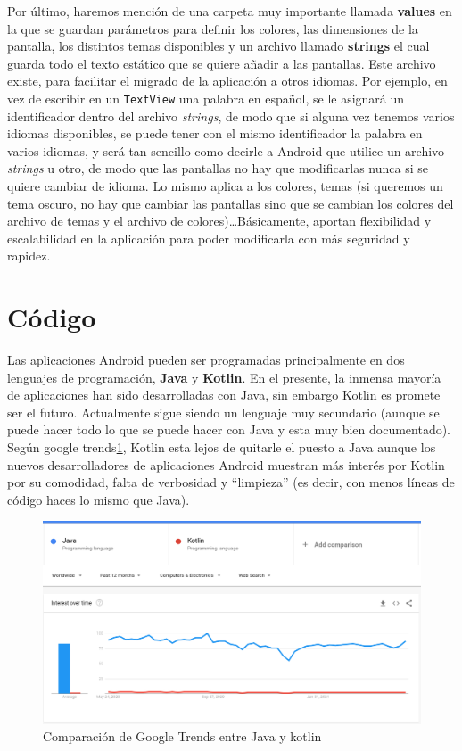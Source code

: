 Por último, haremos mención de una carpeta muy importante llamada \textbf{values} en la que se guardan parámetros para definir los colores, las dimensiones de la pantalla, los distintos temas disponibles y un archivo llamado \textbf{strings} el cual guarda todo el texto estático que se quiere añadir a las pantallas. Este archivo existe, para facilitar el migrado de la aplicación a otros idiomas. Por ejemplo, en vez de escribir en un \verb|TextView| una palabra en español, se le asignará un identificador dentro del archivo \emph{strings}, de modo que si alguna vez tenemos varios idiomas disponibles, se puede tener con el mismo identificador la palabra en varios idiomas, y será tan sencillo como decirle a Android que utilice un archivo \emph{strings} u otro, de modo que las pantallas no hay que modificarlas nunca si se quiere cambiar de idioma. Lo mismo aplica a los colores, temas (si queremos un tema oscuro, no hay que cambiar las pantallas sino que se cambian los colores del archivo de temas y el archivo de colores)\dots Básicamente, aportan flexibilidad y escalabilidad en la aplicación para poder modificarla con más seguridad y rapidez. 




\section{Código} \label{sec:Codigo}

Las aplicaciones Android pueden ser programadas principalmente en dos lenguajes de programación, \textbf{Java} y \textbf{Kotlin}. En el presente, la inmensa mayoría de aplicaciones han sido desarrolladas con Java, sin embargo Kotlin es promete ser el futuro. Actualmente sigue siendo un lenguaje muy secundario (aunque se puede hacer todo lo que se puede hacer con Java y esta muy bien documentado). Según google trends\ref{fig:java_vs_kotlin}, Kotlin esta lejos de quitarle el puesto a Java aunque los nuevos desarrolladores de aplicaciones Android muestran más interés por Kotlin por su comodidad, falta de verbosidad y ``limpieza'' (es decir, con menos líneas de código haces lo mismo que Java). 

\begin{figure}[h!]
  \centering
  \includegraphics[width=0.9\linewidth]{figs/Desarrollo/Popularidad}
  \caption[Java vs Kotlin]{Comparación de Google Trends entre Java y kotlin}
  \label{fig:java_vs_kotlin}
\end{figure}

